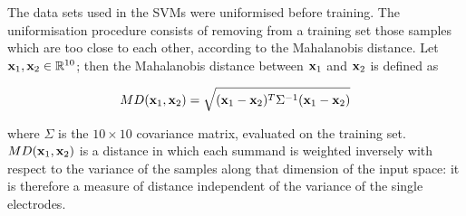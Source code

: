%
%
%
%

The data sets used in the SVMs were uniformised before training.  The
uniformisation procedure consists of removing from a training set
those samples which are too close to each other, according to the
Mahalanobis distance. Let $\mathbf{x}_1, \mathbf{x}_2 \in \mathbb{R}^{10}$; then the
Mahalanobis distance between $\mathbf{x}_1$ and $\mathbf{x}_2$ is defined as

$$ MD(\mathbf{x}_1,\mathbf{x}_2) = \sqrt{(\mathbf{x}_1-\mathbf{x}_2)^T \Sigma^{-1} (\mathbf{x}_1-\mathbf{x}_2)} $$

\noindent where $\Sigma$ is the $10\times10$ covariance matrix, evaluated on
the training set. $MD(\mathbf{x}_1,\mathbf{x}_2)$ is a distance in which each
summand is weighted inversely with respect to the variance of the
samples along that dimension of the input space: it is therefore a
measure of distance independent of the variance of the single
electrodes.


